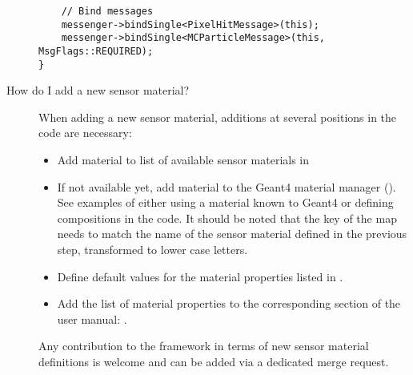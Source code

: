 \begin{description}
\begin{verbatim}
    // Bind messages
    messenger->bindSingle<PixelHitMessage>(this);
    messenger->bindSingle<MCParticleMessage>(this, MsgFlags::REQUIRED);
}
\end{verbatim}
\item[How do I add a new sensor material?]
When adding a new sensor material, additions at several positions in the code are necessary:
\begin{itemize}
\item Add material to list of available sensor materials in 
\item If not available yet, add material to the Geant4 material manager (). See examples of either using a material known to Geant4 or defining compositions in the code. It should be noted that the key of the  map needs to match the name of the sensor material defined in the previous step, transformed to lower case letters.
\item Define default values for the material properties listed in .
\item Add the list of material properties to the corresponding section of the user manual: .
\end{itemize}
Any contribution to the framework in terms of new sensor material definitions is welcome and can be added via a dedicated merge request.
\end{description}

